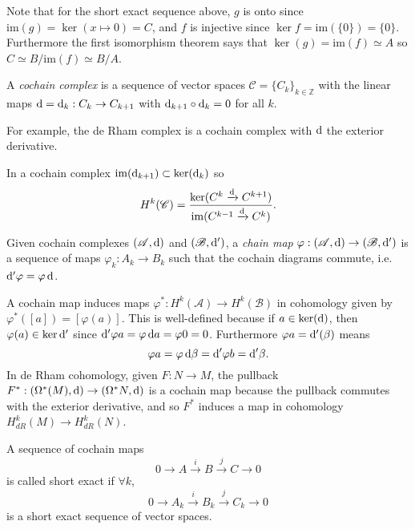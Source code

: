 Note that for the short exact sequence above,
$g$ is onto since $\mathrm{im}(g) = \ker(x \mapsto 0) = C$, and
$f$ is injective since $\ker f = \mathrm{im}(\{ 0 \}) = \{ 0 \}$.
Furthermore the first isomorphism theorem says that
$\ker(g) = \mathrm{im}(f) \simeq A$ so
$C \simeq B / \mathrm{im}(f)  \simeq B / A$.

\begin{defn}
A \emph{cochain complex} is a sequence of vector spaces
$\mathscr{C} = \{C_k\}_{k \in \mathbb{Z}}$ with the
linear maps $\mathop{}\!\mathrm{d} = \mathop{}\!\mathrm{d}_k : C_k \to C_{k+1}$ with
$\mathop{}\!\mathrm{d}_{k+1} \circ \mathop{}\!\mathrm{d}_k = 0$ for all $k$.
\end{defn}

For example, the de Rham complex is a cochain complex
with $\mathop{}\!\mathrm{d}$ the exterior derivative.

In a cochain complex
$\mathrm{im}(\mathop{}\!\mathrm{d}_{k+1}) \subset \ker(\mathop{}\!\mathrm{d}_k)$ so
$$
  H^k(\mathscr{C})
= \frac{\ker(C^k \xrightarrow{\mathop{}\!\mathrm{d}} C^{k+1})}
       {\mathrm{im}(C^{k-1} \xrightarrow{\mathop{}\!\mathrm{d}} C^{k})}.
$$

\begin{defn}
Given cochain complexes
$(\mathscr{A}, \mathop{}\!\mathrm{d})$ and
$(\mathscr{B}, \mathop{}\!\mathrm{d}^\prime)$, a \emph{chain map}
$\varphi: (\mathscr{A}, \mathop{}\!\mathrm{d}) \to (\mathscr{B}, \mathop{}\!\mathrm{d}^\prime)$
is a sequence of maps $\varphi_k : A_k \to B_k$ such that the cochain
diagrams commute, i.e. $\mathop{}\!\mathrm{d}^\prime \varphi = \varphi \mathop{}\!\mathrm{d}$.
\end{defn}

A cochain map induces maps
$\varphi^\ast : H^k(\mathscr{A}) \to H^k(\mathscr{B})$ in
cohomology given by $\varphi^\ast([a]) = [\varphi(a)]$. This is
well-defined because if $a \in \ker(\mathop{}\!\mathrm{d})$, then
$\varphi(a) \in \ker \mathop{}\!\mathrm{d}^\prime$ since
$\mathop{}\!\mathrm{d}^\prime \varphi a = \varphi \mathop{}\!\mathrm{d} a = \varphi 0 = 0$. Furthermore
$\varphi a = \mathop{}\!\mathrm{d}^\prime(\beta)$ means
$$
  \varphi a
= \varphi \mathop{}\!\mathrm{d} \beta
= \mathop{}\!\mathrm{d}^\prime \varphi b
= \mathop{}\!\mathrm{d}^\prime \beta.
$$
In de Rham cohomology, given $F: N \to M$, the pullback
$F^\ast : (\Omega^\ast(M), \mathop{}\!\mathrm{d}) \to (\Omega^\ast N, \mathop{}\!\mathrm{d})$ is a
cochain map because the pullback commutes with the exterior
derivative, and so $F^\ast$ induces a map in cohomology
$H_{dR}^k(M) \to H_{dR}^k(N)$.

\begin{defn}
A sequence of cochain maps
$$
0 \xrightarrow{}
A \xrightarrow{i}
B \xrightarrow{j}
C \xrightarrow{}
0
$$
is called short exact if $\forall k$,
$$
0   \xrightarrow{}
A_k \xrightarrow{i}
B_k \xrightarrow{j}
C_k \xrightarrow{}
0
$$
is a short exact sequence of vector spaces.
\end{defn}

